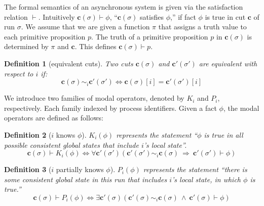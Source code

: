 \documentclass{article}
\newtheorem{defn}{Definition}[section]
\renewcommand{\vec}[1]{\mathbf{#1}}
\begin{document}


The formal semantics of an asynchronous system is given via  the satisfaction relation $\vdash$. Intuitively $\vec{c}(\sigma) \vdash \phi$, ``$\vec{c}(\sigma)$ satisfies $\phi$,'' if fact $\phi$ is true in cut $\vec{c}$ of run $\sigma$. 
We assume that we are given a function $\pi$ that assigns a truth value to each primitive proposition $p$. The truth of a primitive proposition $p$ in $\vec{c}(\sigma)$ is determined by $\pi$ and $\vec{c}$. This defines $\vec{c}(\sigma) \vdash p$.


\begin{defn}[equivalent cuts]
	Two cuts $\vec{c}(\sigma)$ and $\vec{c'}(\sigma')$ are equivalent  with respect to $i$ if: $$\vec{c}(\sigma) \sim_i \vec{c'}(\sigma') \Leftrightarrow \vec{c}(\sigma)[i] = \vec{c'}(\sigma')[i]$$
\end{defn}


We introduce two families of modal operators, denoted by $K_i$ and $P_i$, respectively. Each family indexed by process identifiers. 
Given a fact $\phi$, the modal operators are defined as follows:
\begin{defn}[$i$ knows $\phi$]
	$K_i(\phi)$ represents the statement ``$\phi$ is true in all possible consistent global states that include $i$’s local state''. 
		$$\vec{c}(\sigma) \vdash K_i(\phi) \Leftrightarrow \forall \vec{c'}(\sigma')   (\vec{c'}(\sigma') \sim_i \vec{c}(\sigma) \ \Rightarrow\ \vec{c'}(\sigma') \vdash \phi) $$
\end{defn}


\begin{defn}[$i$ partially knows $\phi$]
	$P_i(\phi)$ represents the statement ``there is some consistent global state in this run that includes $i$’s local state, in which $\phi$ is true.''
		$$\vec{c}(\sigma) \vdash P_i(\phi) \Leftrightarrow \exists \vec{c'}(\sigma) ( \vec{c'}(\sigma) \sim_i \vec{c}(\sigma) \ \wedge\ \vec{c'}(\sigma) \vdash \phi )$$ 
\end{defn}
\end{document}

